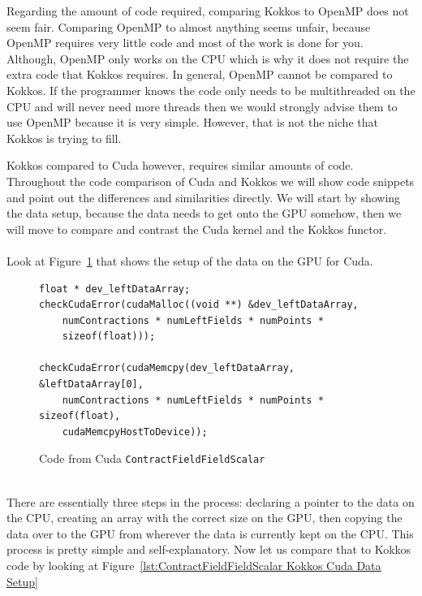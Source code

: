 Regarding the amount of code required, comparing Kokkos to OpenMP does not seem
fair. Comparing OpenMP to almost anything seems unfair, because OpenMP requires
very little code and most of the work is done for you. Although, OpenMP only
works on the CPU which is why it does not require the extra code that Kokkos
requires. In general, OpenMP cannot be compared to Kokkos. If the programmer
knows the code only needs to be multithreaded on the CPU and will never need
more threads then we would strongly advise them to use OpenMP because it is very
simple. However, that is not the niche that Kokkos is trying to fill. 

Kokkos compared to Cuda however, requires similar amounts of code. 
Throughout the code comparison of Cuda and Kokkos we will show
code snippets and point out the differences and similarities directly. We will
start by showing the data setup, because the data needs to get onto the GPU
somehow, then we will move to compare and contrast the Cuda kernel and the Kokkos
functor. \\
\\
Look at Figure~\ref{lst:ContractFieldFieldScalar Cuda Data Setup} that shows the setup of the data on the GPU for Cuda. \\
\begin{figure}[!htb]
	\begin{lstlisting}
float * dev_leftDataArray;
checkCudaError(cudaMalloc((void **) &dev_leftDataArray, 
	numContractions * numLeftFields * numPoints * 
	sizeof(float)));
	
checkCudaError(cudaMemcpy(dev_leftDataArray, &leftDataArray[0], 
	numContractions * numLeftFields * numPoints * sizeof(float), 
	cudaMemcpyHostToDevice));
	\end{lstlisting}
\caption{Code from Cuda \texttt{ContractFieldFieldScalar}
\label{lst:ContractFieldFieldScalar Cuda Data Setup}}
\end{figure}
\\
There are essentially three steps in the process: declaring a pointer to the
data on the CPU, creating an array with the correct size on the GPU, then
copying the data over to the GPU from wherever the data is currently kept on the
CPU. This process is pretty simple and self-explanatory. Now let us compare that
to Kokkos code by looking at Figure~\ref{lst:ContractFieldFieldScalar Kokkos Cuda Data Setup} \\
